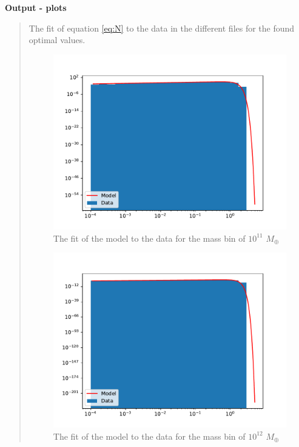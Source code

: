\textbf{Output - plots}
\begin{quote}
The fit of equation \ref{eq:N} to the data in the different files for the found optimal values. 

\begin{figure}[!h]
\centering
\includegraphics[scale=0.7]{plots/satgals_m11.pdf}
\caption{The fit of the model to the data for the mass bin of $10^11$ $M_{\oplus}$}
\end{figure}
\begin{figure}[!hb]
\centering
\includegraphics[scale=0.7]{plots/satgals_m12.pdf}
\caption{The fit of the model to the data for the mass bin of $10^12$ $M_{\oplus}$}
\end{figure}
\newpage


\end{quote}
